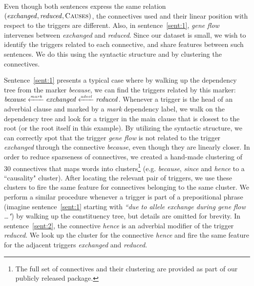 Even though both sentences express the same relation $(\mbox{\emph{exchanged}},\mbox{\emph{reduced}},\mbox{\textsc{Causes}})$, the connectives used and their linear position with respect to the triggers are different. Also, in sentence~\ref{sent:1}, \emph{gene flow} intervenes between \emph{exchanged} and \emph{reduced}. Since our dataset is small, we wish to identify the triggers related to each connective, and share features between such sentences. We do this using the syntactic structure and by clustering the connectives.

Sentence~\ref{sent:1} presents a typical case where by walking up the dependency tree from the marker \emph{because}, we can find the triggers related by this marker: $\mbox{\emph{because}}\xleftarrow{\scriptscriptstyle mark}\mbox{\emph{exchanged}}\xleftarrow{\scriptscriptstyle advcl}\mbox{\emph{reduced}}$. Whenever a trigger is the head of an adverbial clause and marked by a \emph{mark} dependency label, we walk on the dependency tree and look for a trigger in the main clause that is closest to the root (or the root itself in this example). 
By utilizing the syntactic structure, we can correctly spot that the trigger \emph{gene flow} is not related to the trigger \emph{exchanged} through the connective \emph{because}, even though they are linearly closer. In order to reduce sparseness of connectives, we created a hand-made clustering of 30 connectives that maps words into clusters\footnote{The full set of connectives and their clustering are provided as part of our publicly released package.} (e.g. \emph{because}, \emph{since} and \emph{hence} to a ``causality" cluster). After locating the relevant pair of triggers, we use these clusters to fire the same feature for connectives belonging to the same cluster. We perform a similar procedure whenever a trigger is part of a prepositional phrase (imagine sentence~\ref{sent:1} starting with \emph{``due to allele exchange during gene flow \ldots"}) by walking up the constituency tree, but details are omitted for brevity. In sentence~\ref{sent:2}, the connective \emph{hence} is an adverbial modifier of the trigger \emph{reduced}. We look up the cluster for the connective \emph{hence} and fire the same feature for the adjacent triggers \emph{exchanged} and \emph{reduced}.

